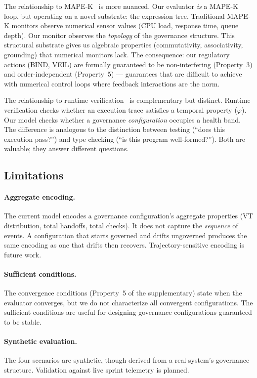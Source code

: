 \documentclass[sigconf,nonacm]{acmart}
\begin{document}
The relationship to MAPE-K~\cite{mapek} is more nuanced. Our evaluator
\emph{is} a MAPE-K loop, but operating on a novel substrate: the expression
tree. Traditional MAPE-K monitors observe numerical sensor values
(CPU load, response time, queue depth). Our monitor observes the \emph{topology}
of the governance structure. This structural substrate gives us algebraic
properties (commutativity, associativity, grounding) that numerical
monitors lack. The consequence: our regulatory actions (BIND, VEIL) are
formally guaranteed to be non-interfering (Property~3) and order-independent
(Property~5) --- guarantees that are difficult to achieve with
numerical control loops where feedback interactions are the norm.

The relationship to runtime verification~\cite{leucker,agentguard} is
complementary but distinct. Runtime verification checks whether an
execution trace satisfies a temporal property ($\varphi$). Our model
checks whether a governance \emph{configuration} occupies a health band.
The difference is analogous to the distinction between testing (``does this
execution pass?'') and type checking (``is this program well-formed?'').
Both are valuable; they answer different questions.

\subsection{Limitations}

\paragraph{Aggregate encoding.}
The current model encodes a governance configuration's aggregate properties
(VT distribution, total handoffs, total checks). It does not capture the
\emph{sequence} of events. A configuration that starts governed and drifts
ungoverned produces the same encoding as one that drifts then recovers.
Trajectory-sensitive encoding is future work.

\paragraph{Sufficient conditions.}
The convergence conditions (Property~5 of the supplementary) state when the
evaluator converges, but we do not characterize all convergent
configurations. The sufficient conditions are useful for designing
governance configurations guaranteed to be stable.

\paragraph{Synthetic evaluation.}
The four scenarios are synthetic, though derived from a real system's
governance structure. Validation against live sprint telemetry is planned.
\end{document}
